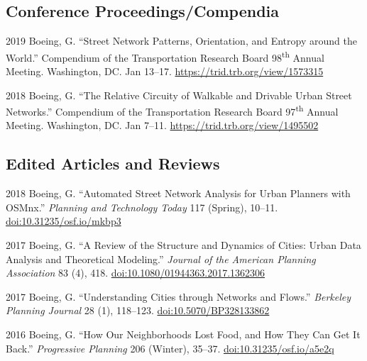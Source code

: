 \documentclass[12pt,letterpaper]{report}
\begin{document}
    \subsection*{Conference Proceedings/Compendia}

    \begin{tablist}

        \item[2019] \tab Boeing, G. \enquote{Street Network Patterns, Orientation, and Entropy around the World.} Compendium of the Transportation Research Board 98\textsuperscript{th} Annual Meeting. Washington, DC. Jan 13--17. \href{https://trid.trb.org/view/1573315}{https://trid.trb.org/view/1573315}

        \item[2018] \tab Boeing, G. \enquote{The Relative Circuity of Walkable and Drivable Urban Street Networks.} Compendium of the Transportation Research Board 97\textsuperscript{th} Annual Meeting. Washington, DC. Jan 7--11. \href{https://trid.trb.org/view/1495502}{https://trid.trb.org/view/1495502}

    \end{tablist}



    \subsection*{Edited Articles and Reviews}

    \begin{tablist}

        \item[2018] \tab Boeing, G. \enquote{Automated Street Network Analysis for Urban Planners with OSMnx.} \textit{Planning and Technology Today} 117 (Spring), 10--11. \href{https://doi.org/10.31235/osf.io/mkbp3}{doi:10.31235/osf.io/mkbp3}

        \item[2017] \tab Boeing, G. \enquote{A Review of the Structure and Dynamics of Cities: Urban Data Analysis and Theoretical Modeling.} \textit{Journal of the American Planning Association} 83 (4), 418. \href{https://doi.org/10.1080/01944363.2017.1362306}{doi:10.1080/01944363.2017.1362306}

        \item[2017] \tab Boeing, G. \enquote{Understanding Cities through Networks and Flows.} \textit{Berkeley Planning Journal} 28 (1), 118--123. \href{https://doi.org/10.5070/BP328133862}{doi:10.5070/BP328133862}

        \item[2016] \tab Boeing, G. \enquote{How Our Neighborhoods Lost Food, and How They Can Get It Back.} \textit{Progressive Planning} 206 (Winter), 35--37. \href{https://doi.org/10.31235/osf.io/a5e2q}{doi:10.31235/osf.io/a5e2q}

    \end{tablist}
\end{document}
